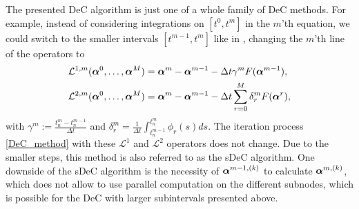 \begin{remark}
	The presented DeC algorithm is just one of a whole family of DeC methods. For example, instead of considering integrations on $[t^0,t^m]$ in the $m$'th equation, we could switch to the smaller intervals $[t^{m-1},t^m]$ like in \cite{minion2003dec,dutt2000dec,torlo2022}, changing the $m$'th line of the operators to
	\begin{align*}
	\mathcal{L}^{1,m}(\boldsymbol{\alpha}^0, \dots, \boldsymbol{\alpha}^M) &=
	\boldsymbol{\alpha}^m-\boldsymbol{\alpha}^{m-1} - \Delta t \gamma^m  F(\boldsymbol{\alpha}^{m-1}),\\
	\mathcal{L}^{2,m}(\boldsymbol{\alpha}^0, \dots, \boldsymbol{\alpha}^M) &=
	\boldsymbol{\alpha}^m-\boldsymbol{\alpha}^{m-1} - \Delta t\sum_{r=0}^M \delta_r^m F(\boldsymbol{\alpha}^r),
	\end{align*} 
	with $\gamma^m:= \frac{t_n^m-t_n^{m-1}}{\Delta t}$ and $\delta_r^m=\frac{1}{\Delta t}\int_{t_n^{m-1}}^{t_n^{m}}\phi_r(s)ds$. 
	The iteration process \eqref{DeC_method} with these $\mathcal{L}^1$ and $\mathcal{L}^2$ operators does not change. Due to the smaller steps, this method is also referred to as the sDeC algorithm. One downside of the sDeC algorithm is the necessity of $\boldsymbol{\alpha}^{m-1,(k)}$ to calculate $\boldsymbol{\alpha}^{m,(k)}$, which does not allow to use parallel computation on the different subnodes, which is possible for the DeC with larger subintervals presented above.\\
	\end{remark}
